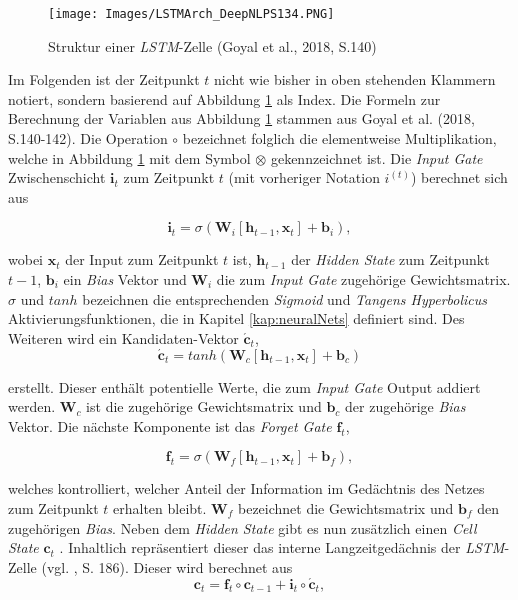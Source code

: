 \documentclass[a4paper,11pt]{article}
\begin{document}
\begin{figure}[!ht]
\begin{center}
\texttt{[image: Images/LSTMArch\_DeepNLPS134.PNG]}
\caption{Struktur einer \textit{LSTM}-Zelle (Goyal et al., 2018, S.140)}
\label{abb:LSTMArch}
\end{center}
\end{figure}

Im Folgenden ist der Zeitpunkt $t$ nicht wie bisher in oben stehenden Klammern notiert, sondern basierend auf Abbildung \ref{abb:LSTMArch} als Index. Die Formeln zur Berechnung der Variablen aus Abbildung \ref{abb:LSTMArch} stammen aus Goyal et al. (2018, S.140-142). Die Operation $\circ$ bezeichnet folglich die elementweise Multiplikation, welche in Abbildung \ref{abb:LSTMArch} mit dem Symbol $\otimes$ gekennzeichnet ist.
Die \textit{Input Gate} Zwischenschicht $\bm{i}_t$ zum Zeitpunkt $t$ (mit vorheriger Notation $i^{(t)}$)  berechnet sich aus

\[ \bm{i}_t = \sigma(\bm{W}_i [\bm{h}_{t-1}, \bm{x}_t] + \bm{b}_i),\]

wobei $\bm{x}_t$ der Input zum Zeitpunkt $t$ ist, $\bm{h}_{t-1}$ der \textit{Hidden State} zum Zeitpunkt $t-1$, $\bm{b}_i$ ein \textit{Bias} Vektor und $\bm{W}_i$ die zum \textit{Input Gate} zugehörige Gewichtsmatrix. $\sigma$ und $tanh$ bezeichnen die entsprechenden \textit{Sigmoid} und \textit{Tangens Hyperbolicus} Aktivierungsfunktionen, die in Kapitel \ref{kap:neuralNets} definiert sind. Des Weiteren wird ein Kandidaten-Vektor $\bm{\acute{c}}_t$, 
\[\bm{\acute{c}}_t = tanh(\bm{W}_c [\bm{h}_{t-1}, \bm{x}_t] + \bm{b}_c)\]

erstellt. Dieser enthält potentielle Werte, die zum \textit{Input Gate} Output addiert werden. $\bm{W}_c$ ist die zugehörige Gewichtsmatrix und $\bm{b}_c$ der zugehörige \textit{Bias} Vektor. Die nächste Komponente ist das \textit{Forget Gate} $\bm{f}_t$,

\[  \bm{f}_t = \sigma(\bm{W}_f [\bm{h}_{t-1}, \bm{x}_t] + \bm{b}_f) ,\]

welches kontrolliert, welcher Anteil der Information im Gedächtnis des Netzes zum Zeitpunkt $t$ erhalten bleibt. $\bm{W}_f$ bezeichnet die Gewichtsmatrix und $\bm{b}_f$ den zugehörigen \textit{Bias}. Neben dem \textit{Hidden State} gibt es nun zusätzlich einen \textit{Cell State} $\bm{c}_t$ . Inhaltlich repräsentiert dieser das interne Langzeitgedächnis der \textit{LSTM}-Zelle (vgl. \cite{keras}, S. 186). Dieser wird berechnet aus
\[\bm{c}_t = \bm{f}_t \circ \bm{c}_{t-1} + \bm{i}_t \circ \bm{\acute{c}}_t ,\]
\end{document}
